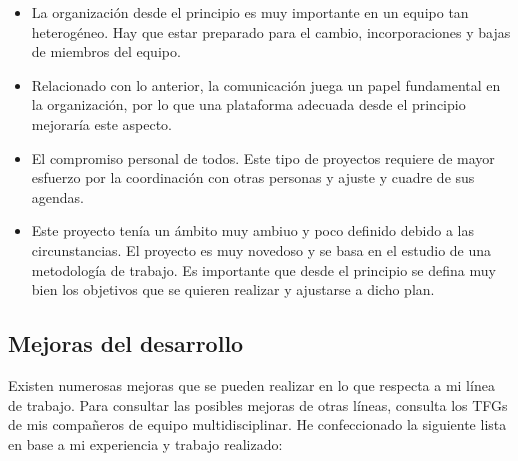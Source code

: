 \begin{itemize}
    \item La organización desde el principio es muy importante en un equipo tan heterogéneo. Hay que estar preparado para el cambio, incorporaciones y bajas de miembros del equipo.
    \item Relacionado con lo anterior, la comunicación juega un papel fundamental en la organización, por lo que una plataforma adecuada desde el principio mejoraría este aspecto.
    \item El compromiso personal de todos. Este tipo de proyectos requiere de mayor esfuerzo por la coordinación con otras personas y ajuste y cuadre de sus agendas.
    \item Este proyecto tenía un ámbito muy ambiuo y poco definido debido a las circunstancias. El proyecto es muy novedoso y se basa en el estudio de una metodología de trabajo. Es importante que desde el principio se defina muy bien los objetivos que se quieren realizar y ajustarse a dicho plan.
\end{itemize}

\subsection{Mejoras del desarrollo}
Existen numerosas mejoras que se pueden realizar en lo que respecta a mi línea de trabajo. Para consultar las posibles mejoras de otras líneas, consulta los TFGs de mis compañeros de equipo multidisciplinar. He confeccionado la siguiente lista en base a mi experiencia y trabajo realizado:


